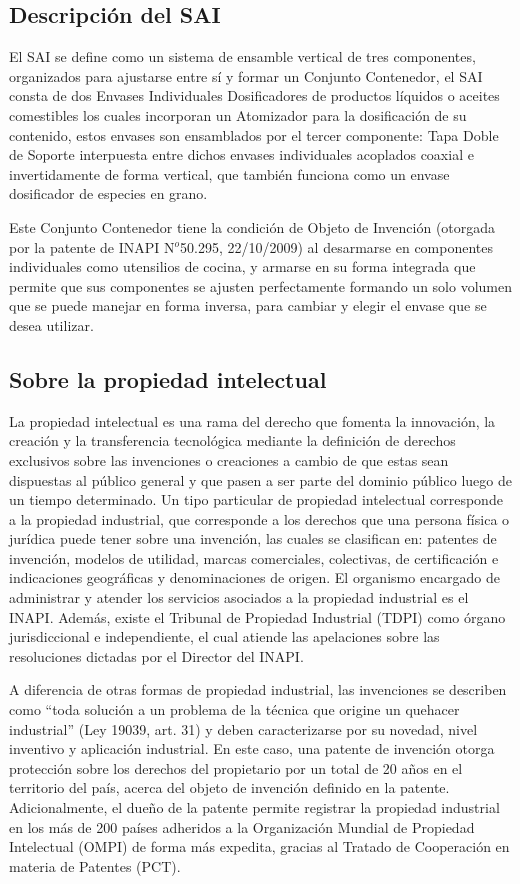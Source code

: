 \subsection{Descripción del SAI}

El SAI se define como un sistema de ensamble vertical de tres componentes, organizados para ajustarse entre sí y formar un Conjunto Contenedor, el SAI consta de dos Envases Individuales Dosificadores de productos líquidos o aceites comestibles los cuales incorporan un Atomizador para la dosificación de su contenido, estos envases son ensamblados por el tercer componente: Tapa Doble de Soporte interpuesta entre dichos envases individuales acoplados coaxial e invertidamente de forma vertical, que también funciona como un envase dosificador de especies en grano.

Este Conjunto Contenedor tiene la condición de Objeto de Invención (otorgada por la patente de INAPI N$^{o}$50.295, 22/10/2009) al desarmarse en componentes individuales como utensilios de cocina, y armarse en su forma integrada que permite que sus componentes se ajusten perfectamente formando un solo volumen que se puede manejar en forma inversa, para cambiar y elegir el envase que se desea utilizar.


\subsection{Sobre la propiedad intelectual}

La propiedad intelectual es una rama del derecho que fomenta la innovación, la creación y la transferencia tecnológica mediante la definición de derechos exclusivos sobre las invenciones o creaciones a cambio de que estas sean dispuestas al público general y que pasen a ser parte del dominio público luego de un tiempo determinado.  Un tipo particular de propiedad intelectual corresponde a la propiedad industrial, que corresponde a los derechos que una persona física o jurídica puede tener sobre una invención, las cuales se clasifican en: patentes de invención, modelos de utilidad, marcas comerciales, colectivas, de certificación e indicaciones geográficas y denominaciones de origen. El organismo encargado de administrar y atender los servicios asociados a la propiedad industrial es el INAPI. Además, existe el Tribunal de Propiedad Industrial (TDPI) como órgano jurisdiccional e independiente, el cual atiende las apelaciones sobre las resoluciones dictadas por el Director del INAPI.

A diferencia de otras formas de propiedad industrial, las invenciones se describen como “toda solución a un problema de la técnica que origine un quehacer industrial” (Ley 19039, art. 31) y deben caracterizarse por su novedad, nivel inventivo y aplicación industrial. En este caso, una patente de invención otorga protección sobre los derechos del propietario por un total de 20 años en el territorio del país, acerca del objeto de invención definido en la patente. Adicionalmente, el dueño de la patente permite registrar la propiedad industrial en los más de 200 países adheridos a la Organización Mundial de Propiedad Intelectual (OMPI) de forma más expedita, gracias al Tratado de Cooperación en materia de Patentes (PCT).

